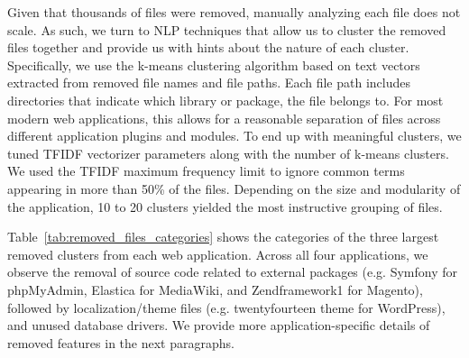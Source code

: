 Given that thousands of files were removed, manually analyzing each file does not scale. As such, we turn to NLP techniques that allow us to cluster the removed files together and provide us with hints about the nature of each cluster. Specifically, we use the k-means clustering algorithm based on text vectors extracted from removed file names and file paths. Each file path includes directories that indicate which library or package, the file belongs to. For most modern web applications, this allows for a reasonable separation of files across different application plugins and modules.
To end up with meaningful clusters, we tuned TFIDF vectorizer parameters along with the number of k-means clusters. We used the TFIDF maximum frequency limit to ignore common terms appearing in more than 50\% of the files. Depending on the size and modularity of the application, 10 to 20 clusters yielded the most instructive grouping of files.

Table~\ref{tab:removed_files_categories} shows the categories of the three largest removed clusters from each web application. Across all four applications, we observe the removal of source code related to external packages (e.g. Symfony for phpMyAdmin, Elastica for MediaWiki, and Zendframework1 for Magento), followed by localization/theme files (e.g. twentyfourteen theme for WordPress), and unused database drivers. We provide more application-specific details of removed features in the next paragraphs.

